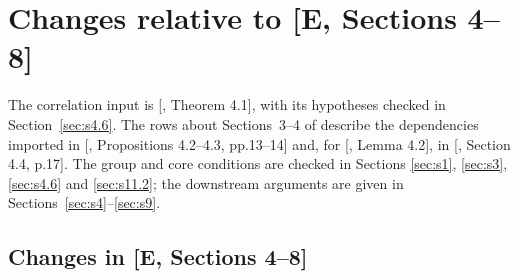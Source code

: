 \documentclass[11pt]{article}
\theoremstyle{definition}
\theoremstyle{definition}
\begin{document}
\appendix
\section{Changes relative to [E, Sections 4--8]}\label{sec:changes}\label{sec:s11}

The correlation input is [, Theorem 4.1], with its hypotheses checked in Section~\ref{sec:s4.6}. The rows about Sections~3--4 of  describe the dependencies imported in [, Propositions 4.2--4.3, pp.13--14] and, for [, Lemma 4.2], in [, Section 4.4, p.17]. The group and core conditions are checked in Sections \ref{sec:s1}, \ref{sec:s3}, \ref{sec:s4.6} and \ref{sec:s11.2}; the downstream arguments are given in Sections~\ref{sec:s4}--\ref{sec:s9}.

\subsection{Changes in [E, Sections 4--8]}\label{sec:s11.1}
\end{document}
